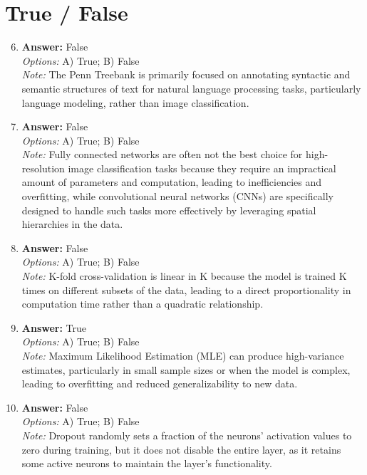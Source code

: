 \documentclass[12pt]{article}
\begin{document}
\section*{True / False}
\begin{enumerate}[label=\arabic*.]
\setcounter{enumi}{5}
\item \textbf{Answer:} False
\\ \textit{Options:} A) True; B) False
\\ \textit{Note:} The Penn Treebank is primarily focused on annotating syntactic and semantic structures of text for natural language processing tasks, particularly language modeling, rather than image classification.
\item \textbf{Answer:} False
\\ \textit{Options:} A) True; B) False
\\ \textit{Note:} Fully connected networks are often not the best choice for high-resolution image classification tasks because they require an impractical amount of parameters and computation, leading to inefficiencies and overfitting, while convolutional neural networks (CNNs) are specifically designed to handle such tasks more effectively by leveraging spatial hierarchies in the data.
\item \textbf{Answer:} False
\\ \textit{Options:} A) True; B) False
\\ \textit{Note:} K-fold cross-validation is linear in K because the model is trained K times on different subsets of the data, leading to a direct proportionality in computation time rather than a quadratic relationship.
\item \textbf{Answer:} True
\\ \textit{Options:} A) True; B) False
\\ \textit{Note:} Maximum Likelihood Estimation (MLE) can produce high-variance estimates, particularly in small sample sizes or when the model is complex, leading to overfitting and reduced generalizability to new data.
\item \textbf{Answer:} False
\\ \textit{Options:} A) True; B) False
\\ \textit{Note:} Dropout randomly sets a fraction of the neurons' activation values to zero during training, but it does not disable the entire layer, as it retains some active neurons to maintain the layer's functionality.
\end{enumerate}
\end{document}
